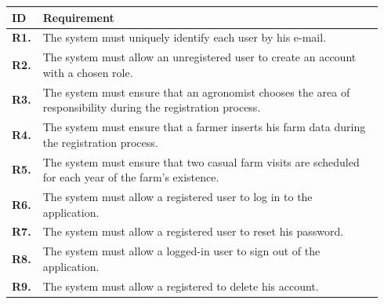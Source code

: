 \begin{longtable}{@{}p{0.06\linewidth} p{0.88\linewidth}}
		\toprule
		\textbf{ID}   & \textbf{Requirement}\\
		\midrule
		
		\textbf{R1.} & The system must uniquely identify each user by his e-mail. \\
		\textbf{R2.} & The system must allow an unregistered user to create an account with a chosen role. \\
		\textbf{R3.} & The system must ensure that an agronomist chooses the area of responsibility during the registration process. \\
		\textbf{R4.} & The system must ensure that a farmer inserts his farm data during the registration process.\\
		\textbf{R5.} & The system must ensure that two casual farm visits are scheduled for each year of the farm's existence.\\
		\textbf{R6.} & The system must allow a registered user to log in to the application. \\
		\textbf{R7.} & The system must allow a registered user to reset his password. \\
		\textbf{R8.} & The system must allow a logged-in user to sign out of the application. \\
		\textbf{R9.} & The system must allow a registered to delete his account. \\
		

\end{longtable}
